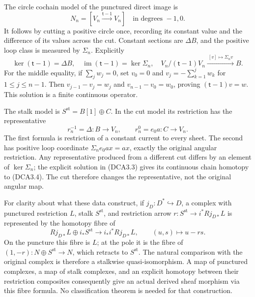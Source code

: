 The circle cochain model of the punctured direct image is \[
N_n=[V_n\xrightarrow{\mathsf t-1}V_n]
\quad\text{in degrees }-1,0.
\tag{DCA3.2}
\] It follows by cutting a positive circle once, recording its constant
value and the difference of its values across the cut. Constant sections
are \(\Delta B\), and the positive loop class is measured by
\(\Sigma_n\). Explicitly \[
\ker(\mathsf t-1)=\Delta B,\quad
\operatorname{im}(\mathsf t-1)=\ker\Sigma_n,\quad
V_n/(\mathsf t-1)V_n\xrightarrow{\ [v]\mapsto\Sigma_nv\ }B.
\tag{DCA3.3}
\] For the middle equality, if \(\sum_jw_j=0\), set \(v_0=0\) and
\(v_j=-\sum_{k=1}^jw_k\) for \(1\leq j\leq n-1\). Then
\(v_{j-1}-v_j=w_j\) and \(v_{n-1}-v_0=w_0\), proving
\((\mathsf t-1)v=w\). This solution is a finite continuous operator.

The stalk model is \(S^{\mathrm{st}}=B[1]\oplus C\). In the cut model
its restriction has the representative \[
r_n^{-1}=\Delta:B\to V_n,\qquad
r_n^0=e_0a:C\to V_n.
\tag{DCA3.4}
\] The first formula is restriction of a constant current to every
sheet. The second has positive loop coordinate \(\Sigma_ne_0ax=ax\),
exactly the original angular restriction. Any representative produced
from a different cut differs by an element of \(\ker\Sigma_n\); the
explicit solution in (DCA3.3) gives its continuous chain homotopy to
(DCA3.4). The cut therefore changes the representative, not the original
angular map.

For clarity about what these data construct, if
\(j_D:D^*\hookrightarrow D\), a complex with punctured restriction
\(L\), stalk \(S^{\mathrm{st}}\), and restriction arrow
\(r:S^{\mathrm{st}}\to i^*Rj_{D*}L\) is represented by the homotopy
fibre of \[
Rj_{D*}L\oplus i_*S^{\mathrm{st}}
\longrightarrow i_*i^*Rj_{D*}L,\qquad (u,s)\longmapsto u-rs.
\tag{DCA3.5}
\] On the puncture this fibre is \(L\); at the pole it is the fibre of
\((1,-r):N\oplus S^{\mathrm{st}}\to N\), which retracts to
\(S^{\mathrm{st}}\). The natural comparison with the original complex is
therefore a stalkwise quasi-isomorphism. A map of punctured complexes, a
map of stalk complexes, and an explicit homotopy between their
restriction composites consequently give an actual derived sheaf
morphism via this fibre formula. No classification theorem is needed for
that construction.

